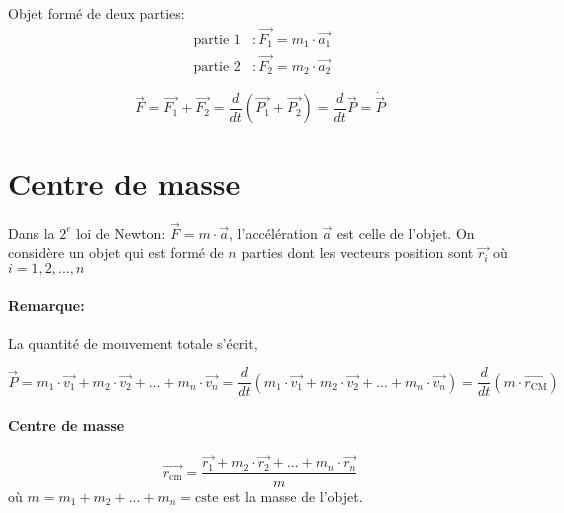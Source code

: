 \documentclass[
    11pt,
    a4paper,
    oneside,
    headinlcude, footinclude,
    twoside,
]{report}
\renewcommand{\vec}[1]{\overrightarrow{#1}}
\begin{document}
\begin{itemize}
\begin{center}
\begin{minipage}{.59\linewidth}
                Objet formé de deux parties:
                \[
                    \begin{split}
                        \text{ partie } 1&: \vec{F_{1}} = m_{1} \cdot \vec{a_{1}}\\
                        \text{ partie } 2&: \vec{F_{2}} = m_{2} \cdot \vec{a_{2}}
                    \end{split}
                \]

                \begin{equation}
                    \vec F = \vec{F_{1}} + \vec{F_{2}} = \frac{d}{dt} (\vec{P_{1}}
                    + \vec{P_{2}}) = \frac{d}{dt} \vec P = \dot{\vec P}
                \end{equation}
            \end{minipage}
        \end{center}
\end{itemize}

\section{Centre de masse}
\label{sec:centre_de_masse}

Dans la $2^e$ loi de Newton: $\vec F = m \cdot \vec a$, l'accélération $\vec a$
est celle de l'objet.  On considère un objet qui est formé de $n$ parties dont
les vecteurs position sont $\vec{r_{i}}$ où $i = 1, 2, ..., n$

\paragraph{Remarque:}

La quantité de mouvement totale s'écrit,

\begin{equation}
    \vec P = m_{1} \cdot \vec{v_{1}} + m_{2} \cdot \vec{v_{2}} + ... + m_{n} \cdot \vec{v_{n}}
    = \frac{d}{dt} (m_{1} \cdot \vec{v_{1}} + m_{2} \cdot \vec{v_{2}} + ... + m_{n} \cdot \vec{v_{n}})
    = \frac{d}{dt} (m \cdot \vec{r_{\text{CM}}}) 
\end{equation}

\paragraph{Centre de masse}
\label{par:centre_de_masse}

\begin{equation}
    \vec{r_{\text{cm}}} = \frac{\vec{r_{1}} + m_{2} \cdot \vec{r_{2}} + ... + m_{n} \cdot \vec{r_{n}}}{m}
\end{equation}
où $m = m_{1} + m_{2} + ... + m_{n} = \text{cste}$ est la masse de l'objet.
\end{document}
